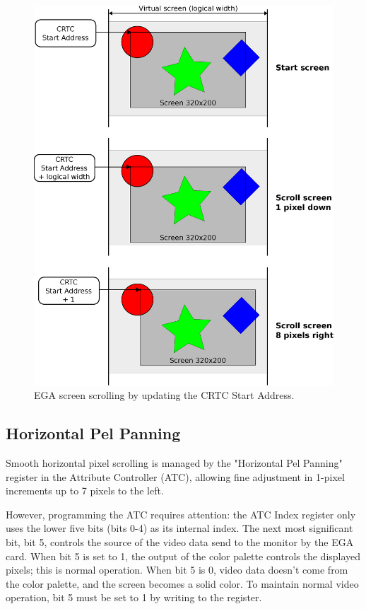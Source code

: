 \documentclass[book.tex]{subfiles}
\begin{document}
\begin{figure}[H]
\centering
\includegraphics[width=1.0\textwidth]{imgs/drawings/virtual_screen.eps}
\caption{EGA screen scrolling by updating the CRTC Start Address.}
\label{fig:tile_refresh}
\end{figure}



\subsection{Horizontal Pel Panning}
Smooth horizontal pixel scrolling is managed by the "Horizontal Pel Panning" register in the Attribute Controller (ATC), allowing fine adjustment in 1-pixel increments up to 7 pixels to the left. \\

\par
However, programming the ATC requires attention: the ATC Index register only uses the lower five bits (bits 0-4) as its internal index. The next most significant bit, bit 5, controls the source of the video data send to the monitor by the EGA card. When bit 5 is set to 1, the output of the color palette controls the displayed pixels; this is normal operation. When bit 5 is 0, video data doesn't come from the color palette, and the screen becomes a solid color. To maintain normal video operation, bit 5 must be set to 1 by writing  to the register.\\
\end{document}
